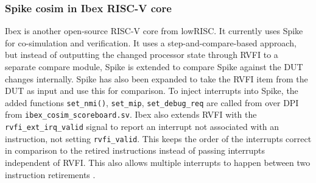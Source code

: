 %
%


\subsubsection{Spike cosim in Ibex RISC-V core}
\label{back:Ibex}

Ibex is another open-source RISC-V core from lowRISC. It currently uses Spike for co-simulation and verification. It uses a step-and-compare-based approach, but instead of outputting the changed processor state through RVFI to a separate compare module, Spike is extended to compare Spike against the DUT changes internally. Spike has also been expanded to take the RVFI item from the DUT as input and use this for comparison. To inject interrupts into Spike, the added functions \lstinline{set_nmi()}, \lstinline{set_mip}, \lstinline{set_debug_req} are called from over DPI from \lstinline{ibex_cosim_scoreboard.sv}.
Ibex also extends RVFI with the \lstinline{rvfi_ext_irq_valid} signal to report an interrupt not associated with an instruction, not setting \lstinline{rvfi_valid}. This keeps the order of the interrupts correct in comparison to the retired instructions instead of passing interrupts independent of RVFI. This also allows multiple interrupts to happen between two instruction retirements \cite{ethzurichanduniversityofbolognaCosimulationSystem2023}. 

